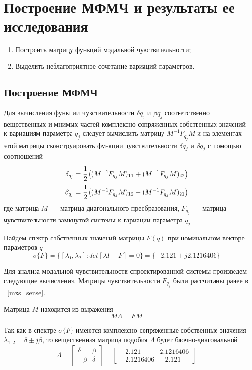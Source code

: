 \section{Построение МФМЧ и результаты ее исследования}

\begin{enumerate}
	\item Построить матрицу функций модальной чувствительности;
	\item Выделить неблагоприятное сочетание вариаций параметров.
\end{enumerate}

\subsection{Построение МФМЧ}

Для вычисления функций чувствительности $\delta q_j$ и $\beta q_j$ соответственно вещественных и мнимых частей комплексно-сопряженных собственных значений к вариациям параметра $q_j$ следует вычислить матрицу $M^{-1} F_{q_j} M$ и на элементах этой матрицы сконструировать функции чувствительности $\delta q_j$ и $\beta q_j$ с помощью соотношений
\begin{align}\label{fsenses}
	\delta_{q_j} = \cfrac{1}{2} \left( (M^{-1} F_{q_j} M)_{11} + (M^{-1} F_{q_j} M)_{22}\right)\\
	\beta_{q_j} = \cfrac{1}{2} \left((M^{-1} F_{q_j} M)_{12} - (M^{-1} F_{q_j} M)_{21} \right)
\end{align}
где матрица $M$~--- матрица диагонального преобразования, $F_{q_j}$~--- матрица чувствительности замкнутой системы к вариации параметра $q_j$.

Найдем спектр собственных значений матрицы $F(q)$ при номинальном векторе параметров $q$
\begin{equation}
	\sigma{\{F\}} = \{[\lambda_1, \lambda_2] :det[\lambda I - F] = 0\} = \{- 2.121 \pm j 2.1216406 \}
\end{equation}

Для анализа модальной чувствительности спроектированной системы произведем следующие вычисления. Матрицы чувствительности $F_{q_j}$ были рассчитаны ранее в ~\ref{mxs_sense}.

Матрица $M$ находится из выражения
\begin{equation}
	M \Lambda = F M
\end{equation}

Так как в спектре $\sigma{\{F\}}$ имеются комплексно-сопряженные собственные значения $\lambda_{1,2} = \delta \pm j \beta$, то вещественная матрица подобия $\Lambda$ будет блочно-диагональной 
\begin{equation}
	\Lambda = 
	\begin{bmatrix}
		\delta &  \beta\\
		-\beta & \delta
	\end{bmatrix}
	=
	\begin{bmatrix}
	  - 2.121  &      2.1216406  \\
		-2.1216406&  - 2.121 
	\end{bmatrix}
\end{equation}


